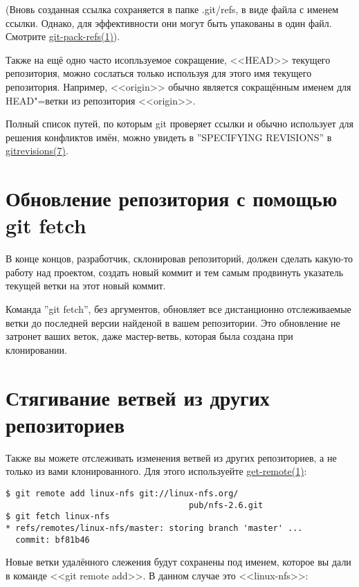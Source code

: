 \documentclass[a4paper, 12pt]{report}
\begin{document}
(Вновь созданная ссылка сохраняется в папке .git/refs, в виде файла с именем ссылки.
Однако, для эффективности они могут быть упакованы в один файл. Смотрите 
\href{http://www.kernel.org/pub/software/scm/git/docs/git-pack-refs.html}{git-pack-refs(1)}).

Также на ещё одно часто исопльзуемое сокращение, <<HEAD>> текущего репозитория, 
можно сослаться только используя для этого имя текущего репозитория. Например, 
<<origin>> обычно является сокращённым именем для HEAD"=ветки из репозитория <<origin>>.

Полный список путей, по которым git проверяет ссылки и обычно использует для
решения конфликтов имён, можно увидеть в ''SPECIFYING REVISIONS'' в 
\href{http://www.kernel.org/pub/software/scm/git/docs/gitrevisions.html}{gitrevisions(7)}.


\section{Обновление репозитория с помощью git fetch}

В конце концов, разработчик, склонировав репозиторий, должен сделать какую-то работу над
проектом, создать новый коммит и тем самым продвинуть указатель текущей ветки на этот
новый коммит.

Команда ''git fetch'', без аргументов, обновляет все дистанционно отслеживаемые ветки до
последней версии найденой в вашем репозитории. Это обновление не затронет ваших веток, 
даже мастер-ветвь, которая была создана при клонировании.


\section{Стягивание ветвей из других репозиториев}

Также вы можете отслеживать изменения ветвей из других репозиториев, а не только из вами
клонированного. Для этого используейте
\href{http://www.kernel.org/pub/software/scm/git/docs/git-remote.html}{get-remote(1)}:

\begin{lstlisting}
$ git remote add linux-nfs git://linux-nfs.org/
                                     pub/nfs-2.6.git
$ git fetch linux-nfs
* refs/remotes/linux-nfs/master: storing branch 'master' ...
  commit: bf81b46
\end{lstlisting}

Новые ветки удалённого слежения будут сохранены под именем, которое вы дали в
команде <<git remote add>>. В данном случае это <<linux-nfs>>:
\end{document}
